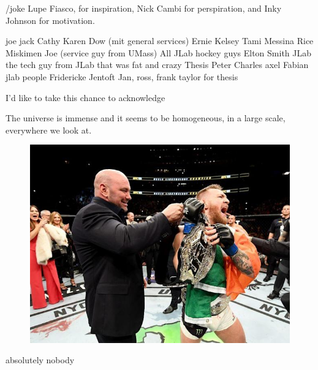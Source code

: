 /joke
Lupe Fiasco, for inspiration, Nick Cambi for perspiration, and Inky Johnson for motivation.

joe jack Cathy Karen Dow (mit general services)
Ernie Kelsey
Tami
Messina
Rice
Miskimen
Joe (service guy from UMass)
All JLab hockey guys
Elton Smith JLab
the tech guy from JLab that was fat and crazy
Thesis Peter Charles axel Fabian jlab people
Fridericke Jentoft
Jan, ross, frank taylor for thesis

I'd like to take this chance to acknowledge


\graphicspath{ {./images/} }

The universe is immense and it seems to be homogeneous, 
in a large scale, everywhere we look at.



\begin{figure}[hbt]
	\centering
	\includegraphics{templates/me.jpg}
\end{figure}


absolutely nobody


\fi
